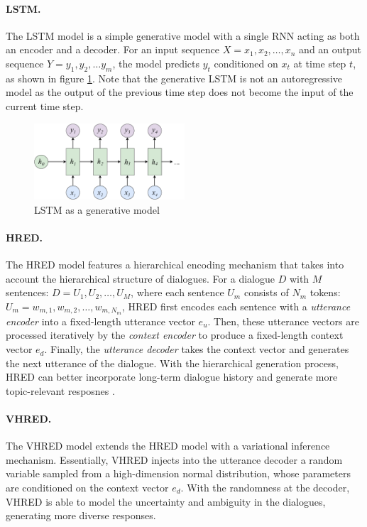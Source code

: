 \documentclass[runningheads]{llncs}
\begin{document}
    \paragraph{LSTM.}
    The LSTM model is a simple generative model with a single RNN acting as both an encoder and a decoder. For an input sequence $X = x_1, x_2, \dots, x_n$ and an output sequence $Y = y_1, y_2, \dots y_m$, the model predicts $y_t$ conditioned on $x_t$ at time step $t$, as shown in figure \ref{fig:LSTM_as_generative}. Note that the generative LSTM is not an autoregressive model as the output of the previous time step does not become the input of the current time step.
    \begin{figure}
        \centering
        \includegraphics[width=0.5\textwidth]{figure/LSTM/generative.pdf}
        \caption{LSTM as a generative model}
        \label{fig:LSTM_as_generative}
    \end{figure}

    \paragraph{HRED.}
    The HRED model \cite{hred-qs,HRED} features a hierarchical encoding mechanism that takes into account the hierarchical structure of dialogues. For a dialogue $D$ with $M$ sentences: $D = U_1, U_2, \dots, U_M$, where each sentence $U_m$ consists of $N_m$ tokens: $U_m = w_{m, 1}, w_{m, 2}, \dots, w_{m, N_m}$, HRED first encodes each sentence with a \emph{utterance encoder} into a fixed-length utterance vector $e_u$. Then, these utterance vectors are processed iteratively by the \emph{context encoder} to produce a fixed-length context vector $e_d$. Finally, the \emph{utterance decoder} takes the context vector and generates the next utterance of the dialogue. With the hierarchical generation process, HRED can better incorporate long-term dialogue history and generate more topic-relevant resposnes \cite{A_Short_Review}.

    \paragraph{VHRED.}
    The VHRED model \cite{VHRED} extends the HRED model with a variational inference mechanism. Essentially, VHRED injects into the utterance decoder a random variable sampled from a high-dimension normal distribution, whose parameters are conditioned on the context vector $e_d$. With the randomness at the decoder, VHRED is able to model the uncertainty and ambiguity in the dialogues, generating more diverse responses.
\end{document}
